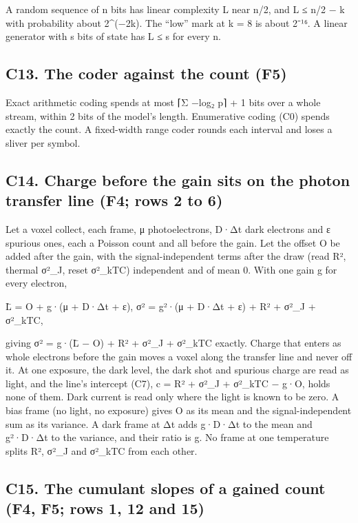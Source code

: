 A random sequence of n bits has linear complexity L near n/2, and L ≤ n/2 − k with probability about 2\textasciicircum{}(−2k). The “low” mark at k = 8 is about 2⁻¹⁶. A linear generator with s bits of state has L ≤ s for every n.

\subsection{\texorpdfstring{C13. The coder against the count (F5)}{C13. The coder against the count (F5)}}

Exact arithmetic coding spends at most ⌈Σ −log₂ p⌉ + 1 bits over a whole stream, within 2 bits of the model's length. Enumerative coding (C0) spends exactly the count. A fixed-width range coder rounds each interval and loses a sliver per symbol.

\subsection{\texorpdfstring{C14. Charge before the gain sits on the photon transfer line (F4; rows 2 to 6)}{C14. Charge before the gain sits on the photon transfer line (F4; rows 2 to 6)}}

Let a voxel collect, each frame, μ photoelectrons, D·Δt dark electrons and ε spurious ones, each a Poisson count and all before the gain. Let the offset O be added after the gain, with the signal-independent terms after the draw (read R², thermal σ²\_\allowbreak{}J, reset σ²\_\allowbreak{}kTC) independent and of mean 0. With one gain g for every electron,

L̄ = O + g·(μ + D·Δt + ε),  σ² = g²·(μ + D·Δt + ε) + R² + σ²\_\allowbreak{}J + σ²\_\allowbreak{}kTC,

giving σ² = g·(L̄ − O) + R² + σ²\_\allowbreak{}J + σ²\_\allowbreak{}kTC exactly. Charge that enters as whole electrons before the gain moves a voxel along the transfer line and never off it. At one exposure, the dark level, the dark shot and spurious charge are read as light, and the line's intercept (C7), c = R² + σ²\_\allowbreak{}J + σ²\_\allowbreak{}kTC − g·O, holds none of them. Dark current is read only where the light is known to be zero. A bias frame (no light, no exposure) gives O as its mean and the signal-independent sum as its variance. A dark frame at Δt adds g·D·Δt to the mean and g²·D·Δt to the variance, and their ratio is g. No frame at one temperature splits R², σ²\_\allowbreak{}J and σ²\_\allowbreak{}kTC from each other.

\subsection{\texorpdfstring{C15. The cumulant slopes of a gained count (F4, F5; rows 1, 12 and 15)}{C15. The cumulant slopes of a gained count (F4, F5; rows 1, 12 and 15)}}

